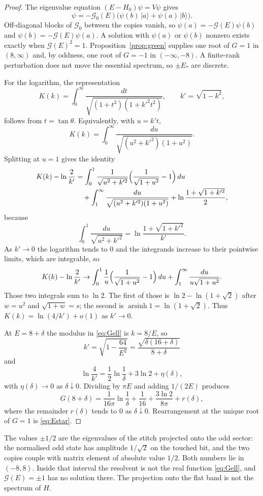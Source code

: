 \begin{proof}
The eigenvalue equation \((E-H_0)\psi=V\psi\) gives
\[
\psi=-\mathcal{G}_0(E)\bigl(\psi(b)\,|a\rangle+\psi(a)\,|b\rangle\bigr).
\]
Off-diagonal blocks of \(\mathcal{G}_0\) between the copies vanish, so
\(\psi(a)=-\mathcal{G}(E)\psi(b)\) and \(\psi(b)=-\mathcal{G}(E)\psi(a)\).
A solution with \(\psi(a)\) or \(\psi(b)\) nonzero exists exactly when
\(\mathcal{G}(E)^2=1\).
Proposition~\ref{prop:green} supplies one root of \(G=1\) in \((8,\infty)\)
and, by oddness, one root of \(G=-1\) in \((-\infty,-8)\).
A finite-rank perturbation does not move the essential spectrum, so
\(\pm E_*\) are discrete.

For the logarithm, the representation
\[
K(k)=\int_0^\infty\frac{dt}{\sqrt{(1+t^2)(1+k'^2 t^2)}},
\qquad k'=\sqrt{1-k^2},
\]
follows from \(t=\tan\theta\).
Equivalently, with \(u=k't\),
\[
K(k)=\int_0^\infty\frac{du}{\sqrt{(u^2+k'^2)(1+u^2)}}.
\]
Splitting at \(u=1\) gives the identity
\begin{align*}
K(k)-\ln\frac{2}{k'}
&=\int_0^1\frac{1}{\sqrt{u^2+k'^2}}
\Bigl(\frac{1}{\sqrt{1+u^2}}-1\Bigr)\,du\\
&\quad+\int_1^\infty\frac{du}{\sqrt{(u^2+k'^2)(1+u^2)}}
+\ln\frac{1+\sqrt{1+k'^2}}{2},
\end{align*}
because
\[
\int_0^1\frac{du}{\sqrt{u^2+k'^2}}=\ln\frac{1+\sqrt{1+k'^2}}{k'}.
\]
As \(k'\to 0\) the logarithm tends to \(0\) and the integrands increase to
their pointwise limits, which are integrable, so
\[
K(k)-\ln\frac{2}{k'}\to
\int_0^1\frac1u\Bigl(\frac{1}{\sqrt{1+u^2}}-1\Bigr)\,du
+\int_1^\infty\frac{du}{u\sqrt{1+u^2}}.
\]
Those two integrals sum to \(\ln 2\).
The first of those is \(\ln 2-\ln(1+\sqrt{2})\) after
\(w=u^2\) and \(\sqrt{1+w}=s\); the second is \(\operatorname{arsinh} 1=\ln(1+\sqrt{2})\).
Thus \(K(k)=\ln(4/k')+o(1)\) as \(k'\to 0\).

At \(E=8+\delta\) the modulus in \eqref{eq:Gell} is \(k=8/E\), so
\[
k'=\sqrt{1-\frac{64}{E^2}}
=\frac{\sqrt{\delta(16+\delta)}}{8+\delta}
\]
and
\[
\ln\frac{4}{k'}=\frac12\ln\frac1\delta+3\ln 2+\eta(\delta),
\]
with \(\eta(\delta)\to 0\) as \(\delta\downarrow 0\).
Dividing by \(\pi E\) and adding \(1/(2E)\) produces
\[
G(8+\delta)
=\frac{1}{16\pi}\ln\frac1\delta+\frac1{16}+\frac{3\ln 2}{8\pi}+r(\delta),
\]
where the remainder \(r(\delta)\) tends to \(0\) as \(\delta\downarrow 0\).
Rearrangement at the unique root of \(G=1\) is \eqref{eq:Estar}.
\end{proof}

The values \(\pm 1/2\) are the eigenvalues of the stitch projected onto the
odd sector: the normalised odd state has amplitude \(1/\sqrt{2}\) on the
touched bit, and the two copies couple with matrix element of absolute
value \(1/2\).
Both numbers lie in \((-8,8)\).
Inside that interval the resolvent is not the real function \eqref{eq:Gell},
and \(\mathcal{G}(E)=\pm 1\) has no solution there.
The projection onto the flat band is not the spectrum of \(H\).

